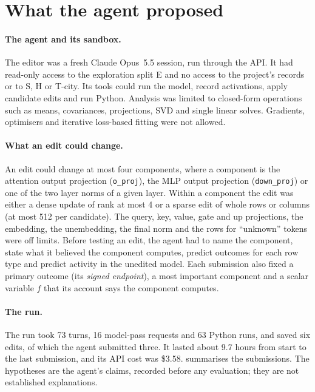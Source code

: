 \section{What the agent proposed}
\label{sec:proposals}

\paragraph{The agent and its sandbox.}
The editor was a fresh Claude Opus~5.5 session, run through the API. It had read-only access to the exploration
split E and no access to the project's records or to S, H or T-city. Its tools could run the model, record
activations, apply candidate edits and run Python. Analysis was limited to closed-form operations such as means,
covariances, projections, SVD and single linear solves. Gradients, optimisers and iterative loss-based fitting were
not allowed.

\paragraph{What an edit could change.}
An edit could change at most four components, where a component is the attention output projection
(\texttt{o\_proj}), the MLP output projection (\texttt{down\_proj}) or one of the two layer norms of a given layer.
Within a component the edit was either a dense update of rank at most 4 or a sparse edit of whole rows or columns
(at most 512 per candidate). The query, key, value, gate and up projections, the embedding, the unembedding, the
final norm and the rows for ``unknown'' tokens were off limits. Before testing an edit, the agent had to name the
component, state what it believed the component computes, predict outcomes for each row type and predict activity
in the unedited model. Each submission also fixed a primary outcome (its \emph{signed endpoint}), a most important
component and a scalar variable $f$ that its account says the component computes.

\paragraph{The run.}
The run took 73 turns, 16 model-pass requests and 63 Python runs, and saved six edits, of which the agent submitted
three. It lasted about 9.7 hours from start to the last submission, and its API cost was \$3.58.
 summarises the submissions. The hypotheses are the agent's claims, recorded before any
evaluation; they are not established explanations.

